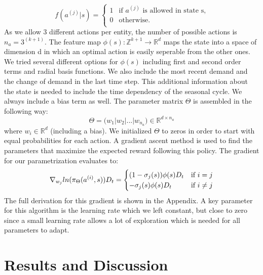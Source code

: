 \documentclass[journal, a4paper]{IEEEtran}
\theoremstyle{plain}
\theoremstyle{definition}
\begin{document}
\begin{equation}
   f(a^{(j)}|s) =
   \begin{cases}
     1 & \text{if $a^{(j)}$ is allowed in state s,} \\
     0 & \text{otherwise.} \\ 
   \end{cases}
\end{equation}
As we allow 3 different actions per entity, the number of possible actions is $n_a = 3^{(k+1)}$. 
The feature map $\phi(s): \mathbb{Z}^{k+1} \rightarrow \mathbb{R}^{d}$ maps the state into a space of dimension d in which an optimal action is easily seperable from the other ones. We tried several different options for $\phi(s)$ including first and second order terms and radial basis functions. We also include the most recent demand and the change of demand in the last time step. This additional information about the state is needed to include the time dependency of the seasonal cycle. We always include a bias term as well.
The parameter matrix $\Theta$ is assembled in the following way:
\begin{equation}
	\Theta = \big(w_1|w_2|...|w_{n_a}\big) \in \mathbb{R}^{d \times n_a }
\end{equation}
where $w_i \in \mathbb{R}^{d}$ (including a bias). We initialized $\Theta$ to zeros in order to start with equal probabilities for each action.
\newline
A gradient ascent method is used to find the parameters that maximize the expected reward following this policy. The gradient for our parametrization evaluates to:
\begin{equation}
\notag
\nabla_{w_j} ln(\pi_\Theta(a^{(i)},s))D_t=
	\begin{cases}
     (1-\sigma_j(s)) \phi(s)D_t  & \text{if $i = j$} \\
     -\sigma_j(s)\phi(s)  D_t & \text{if $i \neq  j$} \\ 
    \end{cases}
\end{equation}
The full derivation for this gradient is shown in the Appendix.\newline
A key parameter for this algorithm is the learning rate which we left constant, but close to zero since a small learning rate allows a lot of exploration which is needed for all parameters to adapt. 



\section{Results and Discussion}
\label{sec:results}
\end{document}
